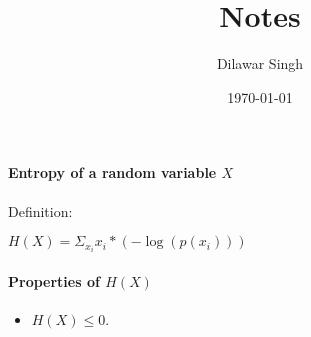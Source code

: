 \documentclass[a4paper,10pt]{article}
\title{Notes}
\author{Dilawar Singh}
\date{\today}
\begin{document}
\maketitle
\begin{abstract}

\end{abstract}

\paragraph{Entropy of a random variable $X$}
    
Definition:

$H(X) = \Sigma_{x_i} x_i * ( - \log \left(p(x_i)\right) )$

\paragraph{Properties of $H(X)$}

\begin{itemize}
    \item $ H(X) \le 0 $.
\end{itemize}
\end{document}
